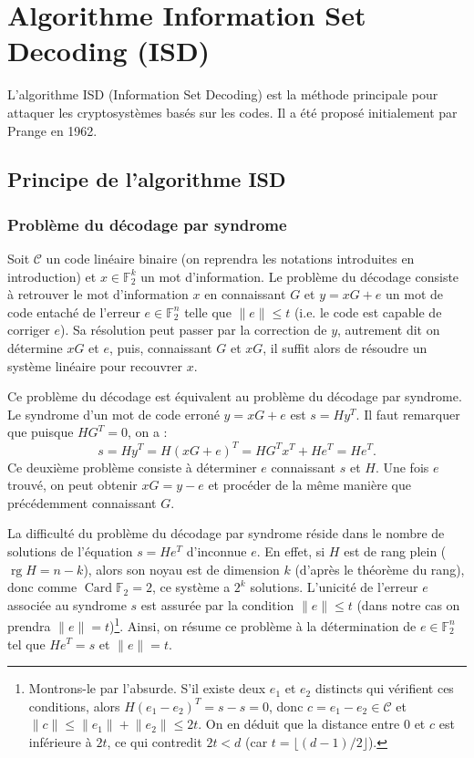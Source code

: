 \documentclass[11pt,a4paper]{article}
\newcommand{\F}{\mathbb{F}_2}
\newcommand{\Code}{\mathcal{C}}
\newcommand{\hw}[1]{\lVert#1\rVert}
\newcommand{\transpose}[1]{#1^{T}}
\DeclareMathOperator{\rang}{rg}
\DeclareMathOperator{\Card}{Card}
\begin{document}
\section{Algorithme Information Set Decoding (ISD)}

L'algorithme ISD (Information Set Decoding) est la méthode principale pour
attaquer les cryptosystèmes basés sur les codes. Il a été proposé initialement
par Prange en 1962.

\subsection{Principe de l'algorithme ISD}

\subsubsection{Problème du décodage par syndrome}
\label{sec-pb-decodage-syndrome}

Soit $\Code$ un code linéaire binaire (on reprendra les notations introduites
en introduction) et $x \in \F^k$ un mot d'information.
Le problème du décodage consiste à retrouver le mot d'information $x$ en
connaissant $G$ et $y = xG + e$ un mot de code entaché de l'erreur $e \in \F^n$
telle que $\hw{e} \le t$ (i.e. le code est capable de corriger $e$).
Sa résolution peut passer par la correction de $y$, autrement dit on détermine
$xG$ et $e$, puis, connaissant $G$ et $xG$, il suffit alors de résoudre un
système linéaire pour recouvrer $x$.

Ce problème du décodage est équivalent au problème du décodage par syndrome.
Le syndrome d'un mot de code erroné $y = xG + e$ est $s = H\transpose{y}$.
Il faut remarquer que puisque $H\transpose{G} = 0$, on a :
\[
  s = H\transpose{y} = H\transpose{(xG + e)}
    = H\transpose{G}\transpose{x} + H\transpose{e}
    = H\transpose{e}.
\]
Ce deuxième problème consiste à déterminer $e$ connaissant $s$ et $H$.
Une fois $e$ trouvé, on peut obtenir $xG = y - e$ et procéder de la même manière
que précédemment connaissant $G$.

La difficulté du problème du décodage par syndrome réside dans le nombre de
solutions de l'équation $s = H\transpose{e}$ d'inconnue $e$.
En effet, si $H$ est de rang plein ($\rang H = n - k$), alors son noyau est de
dimension $k$ (d'après le théorème du rang), donc comme $\Card \F = 2$, ce
système a $2^k$ solutions.
L'unicité de l'erreur $e$ associée au syndrome $s$ est assurée par la condition
$\hw{e} \le t$ (dans notre cas on prendra $\hw{e} = t$)\footnote{Montrons-le par
  l'absurde. S'il existe deux $e_1$ et $e_2$ distincts qui vérifient ces
  conditions, alors $H\transpose{(e_1 - e_2)} = s - s = 0$, donc $c = e_1 - e_2
  \in \Code$ et $\hw{c} \le \hw{e_1} + \hw{e_2} \le 2t$. On en déduit que la
  distance entre $0$ et $c$ est inférieure à $2t$, ce qui contredit $2t < d$
  (car $t = \lfloor (d - 1) / 2 \rfloor$).}.
Ainsi, on résume ce problème à la détermination de $e \in \F^n$ tel que $He^T =
s$ et $\hw{e} = t$.
\end{document}
